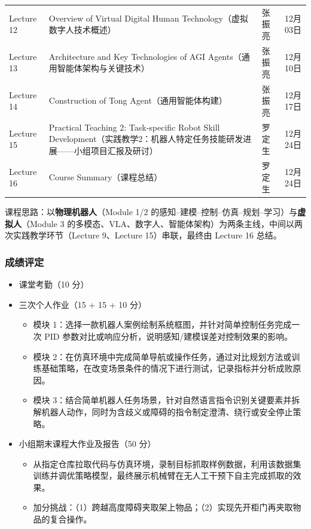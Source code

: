 {\begin{longtable}{@{}p{1.5cm}p{8.7cm}p{2.0cm}p{1.8cm}@{}}
Lecture 12 & Overview of Virtual Digital Human Technology（虚拟数字人技术概述） & 张振亮 & 12月03日 \\
Lecture 13 & Architecture and Key Technologies of AGI Agents（通用智能体架构与关键技术） & 张振亮 & 12月10日 \\
Lecture 14 & Construction of Tong Agent（通用智能体构建） & 张振亮 & 12月17日 \\
Lecture 15 & Practical Teaching 2: Task-specific Robot Skill Development（实践教学2：机器人特定任务技能研发进展——小组项目汇报及研讨） & 罗定生 & 12月24日 \\
Lecture 16 & Course Summary（课程总结） & 罗定生 & 12月24日 \\
\end{longtable}
}

课程思路：以\textbf{物理机器人}（Module 1/2 的感知--建模--控制--仿真--规划--学习）与\textbf{虚拟人}（Module 3 的多模态、VLA、数字人、智能体架构）为两条主线，中间以两次实践教学环节（Lecture 9、Lecture 15）串联，最终由 Lecture 16 总结。

\subsubsection{成绩评定}

\begin{itemize}[itemsep=2pt]
    \item 课堂考勤（10 分）
    \item 三次个人作业（15 + 15 + 10 分）
    \begin{itemize}
        \item 模块 1：选择一款机器人案例绘制系统框图，并针对简单控制任务完成一次 PID 参数对比或响应分析，说明感知/建模误差对控制效果的影响。
        \item 模块 2：在仿真环境中完成简单导航或操作任务，通过对比规划方法或训练基础策略，在改变场景条件的情况下进行测试，记录指标并分析成败原因。
        \item 模块 3：结合简单机器人任务场景，针对自然语言指令识别关键要素并拆解机器人动作，同时为含歧义或障碍的指令制定澄清、绕行或安全停止策略。
    \end{itemize}
    \item 小组期末课程大作业及报告（50 分）
    \begin{itemize}
        \item 从指定仓库拉取代码与仿真环境，录制目标抓取样例数据，利用该数据集训练并调优策略模型，最终展示机械臂在无人工干预下自主完成抓取的效果。
        \item 加分挑战：（1）跨越高度障碍夹取架上物品；（2）实现先开柜门再夹取物品的复合操作。
    \end{itemize}
\end{itemize}

